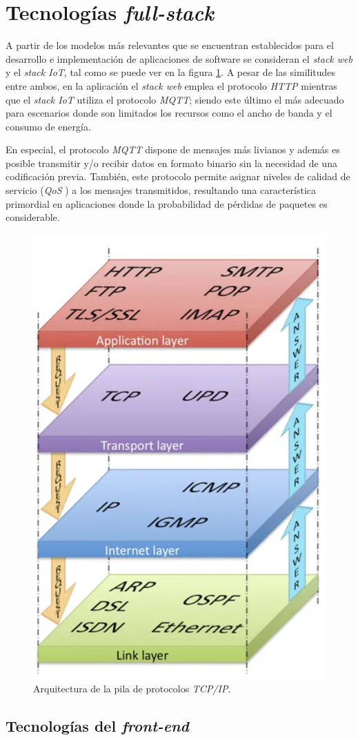 \section{Tecnologías \textit{full-stack}}

A partir de los modelos más relevantes que se encuentran establecidos para el desarrollo e implementación de aplicaciones de software se consideran el \textit{stack web} y el \textit{stack IoT}, tal como se puede ver en la figura \ref{fig:diagBloques}. A pesar de las similitudes entre ambos, en la aplicación el \textit{stack web} emplea el protocolo \textit{HTTP} mientras que el \textit{stack IoT} utiliza el protocolo \textit{MQTT}; siendo este último el más adecuado para escenarios donde son limitados los recursos como el ancho de banda y el consumo de energía.

En especial, el protocolo \textit{MQTT} dispone de mensajes más livianos y además es posible transmitir y/o recibir datos en formato binario sin la necesidad de una codificación previa. También, este protocolo permite asignar niveles de calidad de servicio (\textit{QoS} \citep{ibm-qos}) a los mensajes transmitidos, resultando una característica primordial en aplicaciones donde la probabilidad de pérdidas de paquetes es considerable.


\begin{figure}[htpb]
  \centering 
  \includegraphics[width=.4\textwidth]{Figures/tcp-ip-stack.png}
  \caption{Arquitectura de la pila de protocolos \textit{TCP/IP}.}
  \label{fig:diagBloques}
\end{figure}


\subsection{Tecnologías del \textit{front-end}}

